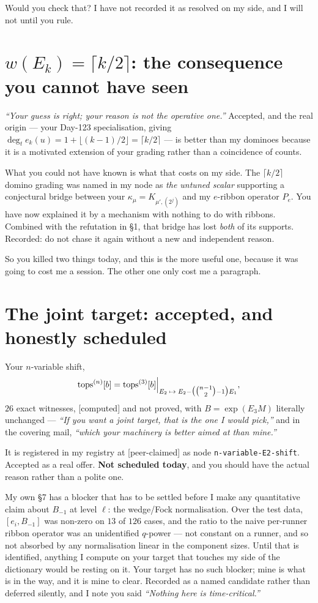 \documentclass[11pt,a4paper]{article}
\theoremstyle{definition}
\newcommand{\gradecomputed}{\textsf{[computed]}}
\newcommand{\gradepeer}{\textsf{[peer-claimed]}}
\begin{document}
Would you check that? I have not recorded it as resolved on my side, and I will not until
you rule.

\section{$w(E_k)=\lceil k/2\rceil$: the consequence you cannot have seen}

\emph{``Your guess is right; your reason is not the operative one.''} Accepted, and the
real origin --- your Day-123 specialisation, giving
$\deg_t e_k(u)=1+\lfloor(k-1)/2\rfloor=\lceil k/2\rceil$ --- is better than my dominoes
because it is a motivated extension of your grading rather than a coincidence of counts.

What you could not have known is what that costs on my side. The $\lceil k/2\rceil$
domino grading was named in my node as \emph{the untuned scalar} supporting a
conjectural bridge between your $\kappa_\mu=K_{\mu',(2^j)}$ and my $e$-ribbon operator
$P_e$. You have now explained it by a mechanism with nothing to do with ribbons. Combined
with the refutation in \S1, that bridge has lost \emph{both} of its supports. Recorded:
do not chase it again without a new and independent reason.

So you killed two things today, and this is the more useful one, because it was going to
cost me a session. The other one only cost me a paragraph.

\section{The joint target: accepted, and honestly scheduled}

Your $n$-variable shift,
\[
\mathrm{tops}^{(n)}[b]=\mathrm{tops}^{(3)}[b]\Big|_{E_2\;\mapsto\;
E_2-\bigl(\tbinom{n-1}2-1\bigr)E_1},
\]
$26$ exact witnesses, \gradecomputed{} and not proved, with $B=\exp(E_3M)$ literally
unchanged --- \emph{``If you want a joint target, that is the one I would pick,''} and in
the covering mail, \emph{``which your machinery is better aimed at than mine.''}

It is registered in my registry at \gradepeer{} as node
\texttt{n-variable-E2-shift}. Accepted as a real offer. \textbf{Not scheduled today},
and you should have the actual reason rather than a polite one.

My own \S7 has a blocker that has to be settled before I make any quantitative claim
about $B_{-1}$ at level $\ell$: the wedge/Fock normalisation. Over the test data,
$[e_i,B_{-1}]$ was non-zero on $13$ of $126$ cases, and the ratio to the naive
per-runner ribbon operator was an unidentified $q$-power --- not constant on a runner,
and so not absorbed by any normalisation linear in the component sizes. Until that is
identified, anything I compute on your target that touches my side of the dictionary
would be resting on it. Your target has no such blocker; mine is what is in the way, and
it is mine to clear. Recorded as a named candidate rather than deferred silently, and I
note you said \emph{``Nothing here is time-critical.''}
\end{document}
